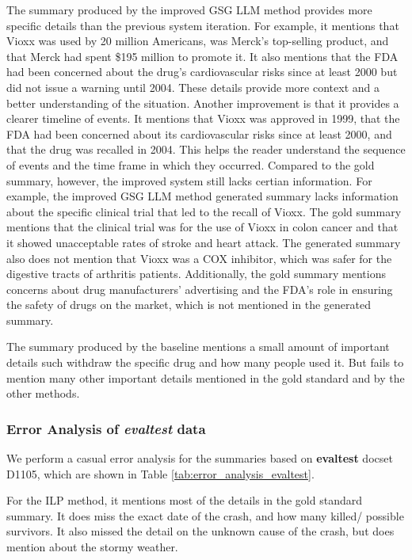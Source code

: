 The summary produced by the improved GSG LLM method provides more specific details than the previous system iteration. For example, it mentions that Vioxx was used by 20 million Americans, was Merck’s top-selling product, and that Merck had spent \$195 million to promote it. It also mentions that the FDA had been concerned about the drug’s cardiovascular risks since at least 2000 but did not issue a warning until 2004. These details provide more context and a better understanding of the situation. Another improvement is that it provides a clearer timeline of events. It mentions that Vioxx was approved in 1999, that the FDA had been concerned about its cardiovascular risks since at least 2000, and that the drug was recalled in 2004. This helps the reader understand the sequence of events and the time frame in which they occurred. Compared to the gold summary, however, the improved system still lacks certian information. For example, the improved GSG LLM method generated summary lacks information about the specific clinical trial that led to the recall of Vioxx. The gold summary mentions that the clinical trial was for the use of Vioxx in colon cancer and that it showed unacceptable rates of stroke and heart attack. The generated summary also does not mention that Vioxx was a COX inhibitor, which was safer for the digestive tracts of arthritis patients. Additionally, the gold summary mentions concerns about drug manufacturers’ advertising and the FDA’s role in ensuring the safety of drugs on the market, which is not mentioned in the generated summary.

The summary produced by the baseline mentions a small amount of important details such withdraw the specific drug and how many people used it. But fails to mention many other important details mentioned in the gold standard and by the other methods.

\subsubsection{Error Analysis of \textit{evaltest} data}
We perform a casual error analysis for the summaries based on \textbf{evaltest} docset D1105, which are shown in Table \ref{tab:error_analysis_evaltest}.

For the ILP method, it mentions most of the details in the gold standard summary. It does miss the exact date of the crash, and how many killed/ possible survivors. It also missed the detail on the unknown cause of the crash, but does mention about the stormy weather.

